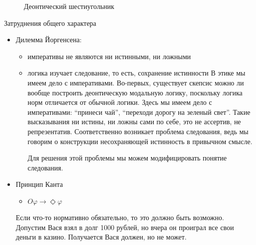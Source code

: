 \documentclass[openany]{book}
\theoremstyle{plain}
\theoremstyle{definition}
\begin{document}
\begin{figure}
\centering
{}
\caption{Деонтический шестиугольник}
\end{figure}

Затруднения общего характера 
\begin{itemize}
\item Дилемма Йоргенсена:
\begin{itemize}
	\item императивы не являются ни истинными, ни ложными
	\item логика изучает следование, то есть, сохранение истинности
	В этике мы имеем дело с императивами. Во-первых, существует скепсис можно ли вообще построить деонтическую модальную логику, поскольку логика норм отличается от обычной логики. Здесь мы имеем дело с императивами: ``принеси чай'', ``переходи дорогу на зеленый свет''. Такие высказывания ни истины, ни ложны сами по себе, это не ассертив, не репрезентатив. Соответственно возникает проблема следования, ведь мы говорим о конструкции несохраняющей истинность в привычном смысле. 
	
	Для решения этой проблемы мы можем модифицировать понятие следования.
\end{itemize}
\item Принцип Канта
	\begin{itemize}
		\item \(O \varphi \to \Diamond \varphi\)
	\end{itemize}
	Если что-то нормативно обязательно, то это должно быть возможно. Допустим Вася взял в долг 1000 рублей, но вчера он проиграл все свои деньги в казино. Получается Вася должен, но не может.
\end{itemize}
\end{document}
